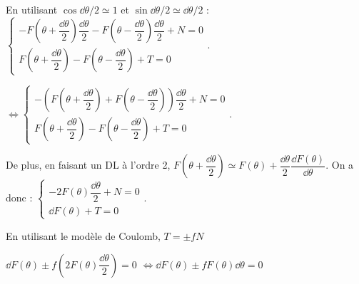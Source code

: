 \ifprof
\begin{corrige} ~\\
En utilisant $\cos \dd \theta/2 \simeq 1$ et $\sin \dd \theta/2 \simeq \dd \theta/2$ :
$\left\{ 
\begin{array}{l}
-F\left(\theta+\dfrac{\dd \theta}{2}\right)\dfrac{\dd \theta}{2} -F\left(\theta-\dfrac{\dd \theta}{2}\right) \dfrac{\dd \theta}{2} + N= 0 \\
F\left(\theta+\dfrac{\dd \theta}{2}\right) -F\left(\theta-\dfrac{\dd \theta}{2}\right) + T = 0
\end{array}
\right.$.


$
\Leftrightarrow \left\{ 
\begin{array}{l}
-\left(F\left(\theta+\dfrac{\dd \theta}{2}\right) +F\left(\theta-\dfrac{\dd \theta}{2}\right)\right) \dfrac{\dd \theta}{2} + N= 0 \\
F\left(\theta+\dfrac{\dd \theta}{2}\right) -F\left(\theta-\dfrac{\dd \theta}{2}\right) + T = 0
\end{array}
\right.$.

De plus, en faisant un DL à l'ordre 2, $F\left(\theta+\dfrac{\dd \theta}{2}\right)\simeq  F(\theta)+\dfrac{\dd \theta}{2} \dfrac{\dd F(\theta)}{\dd \theta}$.
On a donc : 
$
\left\{ 
\begin{array}{l}
-2 F\left(\theta\right) \dfrac{\dd \theta}{2} + N= 0 \\
 \dd F(\theta)+ T = 0
\end{array}
\right.$.

En utilisant le modèle de Coulomb, $T=\pm fN$

 $ \dd F(\theta)\pm f \left( 2 F\left(\theta\right) \dfrac{\dd \theta}{2}\right) = 0$
 $  \Leftrightarrow \dd F(\theta)\pm f  F\left(\theta\right) \dd \theta = 0$

%
%
%
%
%
%
%
%

\end{corrige}
\else
\fi


